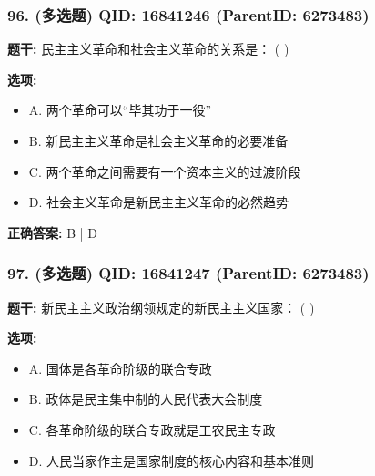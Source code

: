 \documentclass[12pt,UTF8]{ctexart}
\begin{document}
\vspace{0.3em}\hrulefill\vspace{0.7em}

\subsubsection*{96. (多选题) \small QID: 16841246 (ParentID: 6273483)}

\textbf{题干:}
民主主义革命和社会主义革命的关系是： ( )



\textbf{选项:}
\begin{itemize}[leftmargin=*]

  \item A. 两个革命可以“毕其功于一役”

  \item B. 新民主主义革命是社会主义革命的必要准备

  \item C. 两个革命之间需要有一个资本主义的过渡阶段

  \item D. 社会主义革命是新民主主义革命的必然趋势

\end{itemize}

\textbf{正确答案:}
B | D

\vspace{0.3em}\hrulefill\vspace{0.7em}

\subsubsection*{97. (多选题) \small QID: 16841247 (ParentID: 6273483)}

\textbf{题干:}
新民主主义政治纲领规定的新民主主义国家： ( )



\textbf{选项:}
\begin{itemize}[leftmargin=*]

  \item A. 国体是各革命阶级的联合专政

  \item B. 政体是民主集中制的人民代表大会制度

  \item C. 各革命阶级的联合专政就是工农民主专政

  \item D. 人民当家作主是国家制度的核心内容和基本准则

\end{itemize}
\end{document}
